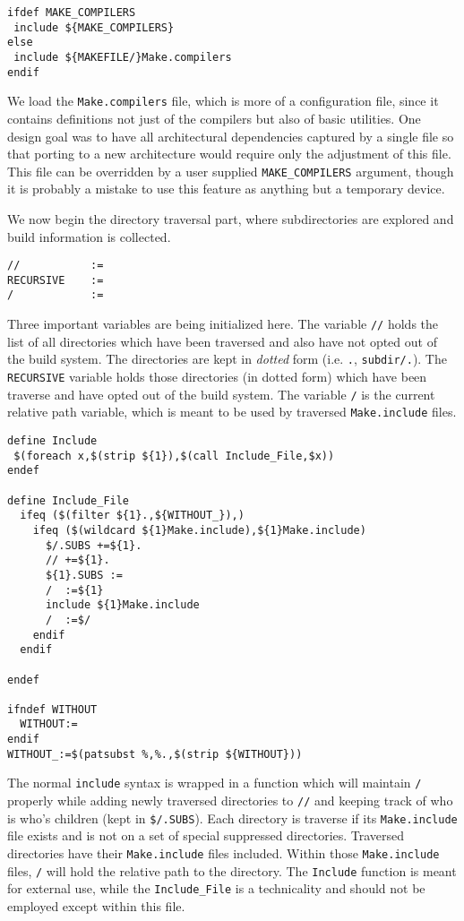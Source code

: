 \documentclass{article}
\begin{document}
\begin{verbatim}
ifdef MAKE_COMPILERS
 include ${MAKE_COMPILERS}
else
 include ${MAKEFILE/}Make.compilers
endif
\end{verbatim}
We load the \verb+Make.compilers+ file, which is more of a
configuration file, since it contains definitions not just of the
compilers but also of basic utilities.  One design goal was to have
all architectural dependencies captured by a single file so
that porting to a new architecture would require only the adjustment
of this file.  This file can be overridden by a user supplied
\verb+MAKE_COMPILERS+ argument, though it is probably a mistake
to use this feature as anything but a temporary device.

We now begin the directory traversal part, where subdirectories are
explored and build information is collected.

\begin{verbatim}
//           :=
RECURSIVE    :=
/            :=
\end{verbatim}
Three important variables are being initialized here.  The variable
\verb+//+ holds the list of all directories which have been traversed
and also have not opted out of the build system.  The directories are
kept in {\em dotted} form (i.e. \verb+.+, \verb+subdir/.+).  The
\verb+RECURSIVE+ variable holds those directories (in dotted form)
which have been traverse and have opted out of the build system.  The
variable \verb+/+ is the current relative path variable, which is
meant to be used by traversed \verb+Make.include+ files.


\begin{verbatim}
define Include
 $(foreach x,$(strip ${1}),$(call Include_File,$x))
endef

define Include_File
  ifeq ($(filter ${1}.,${WITHOUT_}),)
    ifeq ($(wildcard ${1}Make.include),${1}Make.include)
      $/.SUBS +=${1}.
      // +=${1}.
      ${1}.SUBS :=
      /  :=${1}
      include ${1}Make.include
      /  :=$/
    endif
  endif

endef

ifndef WITHOUT
  WITHOUT:=
endif
WITHOUT_:=$(patsubst %,%.,$(strip ${WITHOUT}))
\end{verbatim}
The normal \verb+include+ syntax is wrapped in a function which will
maintain \verb+/+ properly while adding newly traversed directories to
\verb+//+ and keeping track of who is who's children (kept in
\verb+$/.SUBS+).  Each directory
is traverse if its \verb+Make.include+ file exists and is not on
a set of special suppressed directories.  Traversed directories
have their \verb+Make.include+ files included.  Within those
\verb+Make.include+ files, \verb+/+ will hold the relative path
to the directory.  The \verb+Include+ function is meant for external
use, while the \verb+Include_File+ is a technicality and should not
be employed except within this file.
\end{document}
